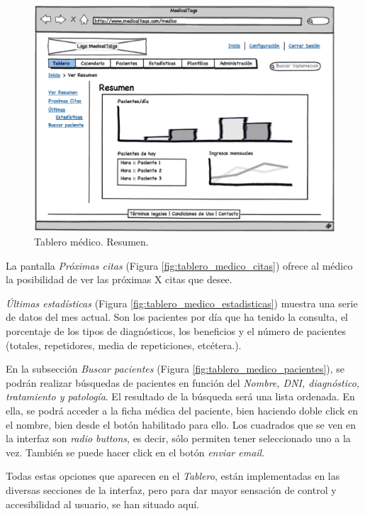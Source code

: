 \documentclass[a4paper,oneside,11pt]{book}
\begin{document}
			\begin{figure}[H]
			  \centering
			    \includegraphics[width=12cm]{img/eps/8_Dashboard_Medico_Tablero.eps}
			  \caption{Tablero médico. Resumen.}
			  \label{fig:tablero_medico_resumen}
			\end{figure}
			
			La pantalla \textit{Próximas citas} (Figura \ref{fig:tablero_medico_citas}) ofrece al médico la posibilidad de ver las próximas X citas que desee.	
			
			\textit{Últimas estadísticas} (Figura \ref{fig:tablero_medico_estadisticas}) muestra una serie de datos del mes actual. Son los pacientes por día que ha tenido la consulta, el porcentaje de los tipos de diagnósticos, los beneficios y el número de pacientes (totales, repetidores, media de repeticiones, etcétera.).
		
			En la subsección \textit{Buscar pacientes} (Figura \ref{fig:tablero_medico_pacientes}), se podrán realizar búsquedas de pacientes en función del \textit{Nombre, DNI, diagnóstico, tratamiento y patología}. El resultado de la búsqueda será una lista ordenada. En ella, se podrá acceder a la ficha médica del paciente, bien haciendo doble click en el nombre, bien desde el botón habilitado para ello. Los cuadrados que se ven en la interfaz son \textit{radio buttons}, es decir, sólo permiten tener seleccionado uno a la vez. También se puede hacer click en el botón \textit{enviar email}.
			
			Todas estas opciones que aparecen en el \textit{Tablero}, están implementadas en las diversas secciones de la interfaz, pero para dar mayor sensación de control y accesibilidad al usuario, se han situado aquí.
			
\end{document}
